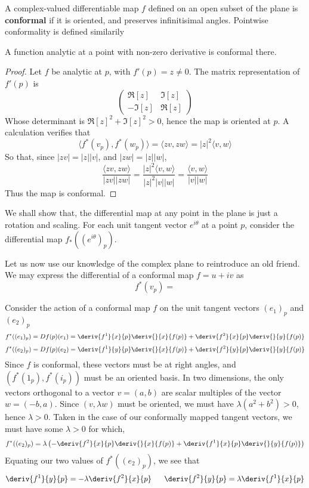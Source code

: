 \begin{definition}
    A complex-valued differentiable map $f$ defined on an open subset of the plane is {\bf conformal} if it is oriented, and preserves infinitisimal angles. Pointwise conformality is defined similarily
\end{definition}

\begin{lemma}
    A function analytic at a point with non-zero derivative is conformal there.
\end{lemma}
\begin{proof}
    Let $f$ be analytic at $p$, with $f'(p) = z \neq 0$. The matrix representation of $f'(p)$ is
    \[ \begin{pmatrix} \Re[z] & \Im[z] \\ -\Im[z] & \Re[z] \end{pmatrix} \]
    Whose determinant is $\Re[z]^2 + \Im[z]^2 > 0$, hence the map is oriented at $p$. A calculation verifies that
    \[ \langle f^*(v_p), f^*(w_p) \rangle = \langle zv, zw \rangle = |z|^2 \langle v, w \rangle  \]
    So that, since $|zv| = |z||v|$, and $|zw| = |z||w|$,
    \[ \frac{\langle zv, zw \rangle}{|zv||zw|} = \frac{|z|^2 \langle v, w \rangle }{|z|^2|v||w|} = \frac{\langle v, w \rangle}{|v||w|} \]
    Thus the map is conformal.
\end{proof}

We shall show that, the differential map at any point in the plane is just a rotation and scaling. For each unit tangent vector $e^{i\theta}$ at a point $p$, consider the differential map $f_*((e^{i\theta})_p)$.

Let us now use our knowledge of the complex plane to reintroduce an old friend. We may express the differential of a conformal map $f = u + iv$ as
%
\[ f^*(v_p) = \]

Consider the action of a conformal map $f$ on the unit tangent vectors $(e_1)_p$ and $(e_2)_p$
%
\[ f^*((e_1)_p) = Df(p)(e_1) = \deriv{f^1}{x}{p} \deriv{}{x}{f(p)} + \deriv{f^2}{x}{p} \deriv{}{y}{f(p)} \]
%
\[ f^*((e_2)_p) = Df(p)(e_2) = \deriv{f^1}{y}{p} \deriv{}{x}{f(p)} + \deriv{f^2}{y}{p} \deriv{}{y}{f(p)} \]
%
Since $f$ is conformal, these vectors must be at right angles, and $(f^*(1_p), f^*(i_p))$ must be an oriented basis. In two dimensions, the only vectors orthogonal to a vector $v = (a,b)$ are scalar multiples of the vector $w = (-b,a)$. Since $(v, \lambda w)$ must be oriented, we must have $\lambda (a^2 + b^2) > 0$, hence $\lambda > 0$. Taken in the case of our conformally mapped tangent vectors, we must have some $\lambda > 0$ for which,
%
\[ f^*((e_2)_p) = \lambda \left( -\deriv{f^2}{x}{p} \deriv{}{x}{f(p)} + \deriv{f^1}{x}{p} \deriv{}{y}{f(p)} \right) \]
%
Equating our two values of $f^*((e_2)_p)$, we see that
%
\[ \deriv{f^1}{y}{p} = - \lambda \deriv{f^2}{x}{p}\ \ \ \ \ \deriv{f^2}{y}{p} = \lambda \deriv{f^1}{x}{p} \]











